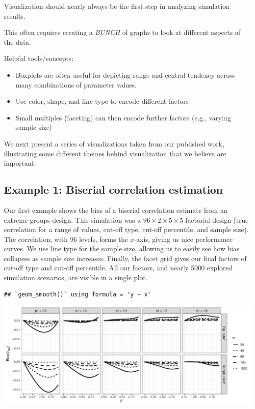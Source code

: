 \documentclass[
]{book}
\providecommand{\tightlist}{%
  \setlength{\itemsep}{0pt}\setlength{\parskip}{0pt}}
\begin{document}
Visualization should nearly always be the first step in analyzing simulation results.

This often requires creating a \emph{BUNCH} of graphs to look at different aspects of the data.

Helpful tools/concepts:

\begin{itemize}
\tightlist
\item
  Boxplots are often useful for depicting range and central tendency across many combinations of parameter values.
\item
  Use color, shape, and line type to encode different factors
\item
  Small multiples (faceting) can then encode further factors (e.g., varying sample size)
\end{itemize}

We next present a series of visualizations taken from our published work, illustrating some different themes behind visualization that we believe are important.

\subsection{Example 1: Biserial correlation estimation}\label{example-1-biserial-correlation-estimation}

Our first example shows the bias of a biserial correlation estimate from an extreme groups design.
This simulation was a \(96 \times 2 \times 5 \times 5\) factorial design (true correlation for a range of values, cut-off type, cut-off percentile, and sample size).
The correlation, with 96 levels, forms the \(x\)-axis, giving us nice performance curves.
We use line type for the sample size, allowing us to easily see how bias collapses as sample size increases.
Finally, the facet grid gives our final factors of cut-off type and cut-off percentile.
All our factors, and nearly 5000 explored simulation scenarios, are visible in a single plot.

\begin{verbatim}
## `geom_smooth()` using formula = 'y ~ x'
\end{verbatim}

\begin{center}\includegraphics[width=0.75\linewidth]{Designing-Simulations-in-R_files/figure-latex/unnamed-chunk-194-1} \end{center}
\end{document}
